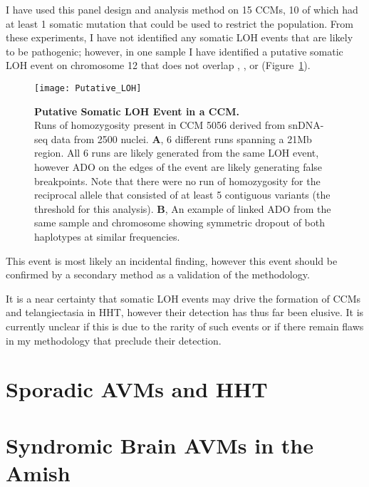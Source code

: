 I have used this panel design and analysis method on 15 CCMs, 10 of which had at least 1 somatic mutation that could be used to restrict the population. From these experiments, I have not identified any somatic LOH events that are likely to be pathogenic; however, in one sample I have identified a putative somatic LOH event on chromosome 12 that does not overlap , , or  (Figure~\ref{Putative_LOH}). 
\begin{figure}[tbp!]
\begin{center}
\texttt{[image: Putative\_LOH]}
\end{center}
\caption[Putative Somatic LOH Event in a CCM]{\textbf{Putative Somatic LOH Event in a CCM.} \\ Runs of homozygosity present in CCM 5056 derived from snDNA-seq data from 2500 nuclei. \textbf{A}, 6 different runs spanning a 21Mb region. All 6 runs are likely generated from the same LOH event, however ADO on the edges of the event are likely generating false breakpoints. Note that there were no run of homozygosity for the reciprocal allele that consisted of at least 5 contiguous variants (the threshold for this analysis). \textbf{B}, An example of linked ADO from the same sample and chromosome showing symmetric dropout of both haplotypes at similar frequencies.}
\label{Putative_LOH}
\end{figure}
This event is most likely an incidental finding, however this event should be confirmed by a secondary method as a validation of the methodology.

It is a near certainty that somatic LOH events may drive the formation of CCMs and telangiectasia in HHT, however their detection has thus far been elusive. It is currently unclear if this is due to the rarity of such events or if there remain flaws in my methodology that preclude their detection.





\section{Sporadic AVMs and HHT}



\section{Syndromic Brain AVMs in the Amish}




